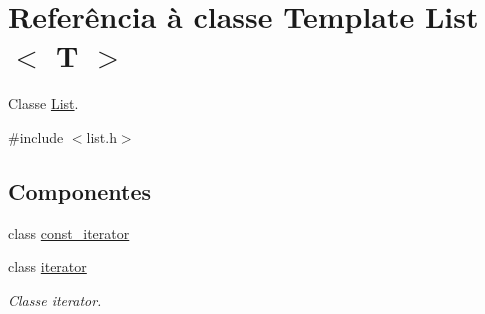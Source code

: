\hypertarget{class_list}{}\section{Referência à classe Template List$<$ T $>$}
\label{class_list}


Classe \hyperlink{class_list}{List}.  




{\ttfamily \#include $<$list.\+h$>$}

\subsection*{Componentes}
\begin{DoxyCompactItemize}
\item 
class \hyperlink{class_list_1_1const__iterator}{const\+\_\+iterator}
\item 
class \hyperlink{class_list_1_1iterator}{iterator}
\begin{DoxyCompactList}\small\item\em Classe iterator. \end{DoxyCompactList}\end{DoxyCompactItemize}
